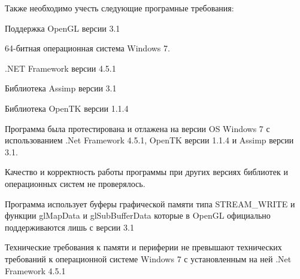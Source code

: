Также необходимо учесть следующие програмные требования:
\begin{my_enumerate}
\item Поддержка OpenGL версии 3.1
\item 64-битная операционная система Windows 7.
\item .NET Framework версии 4.5.1
\item Библиотека Assimp версии 3.1
\item Библиотека OpenTK версии 1.1.4
\end{my_enumerate}

Программа была протестирована и отлажена на версии OS Windows 7 с использованием .Net Framework 4.5.1, OpenTK версии 1.1.4 и Assimp версии 3.1.

Качество и корректность работы программы при других версиях библиотек и операционных систем не проверялось.

Программа использует буферы графической памяти типа STREAM\_WRITE и функции glMapData и glSubBufferData которые в OpenGL официально поддерживаются лишь с версии 3.1

Технические требования к памяти и периферии не превышают технических требований к операционной системе Windows 7 с установленным на ней .Net Framework 4.5.1
